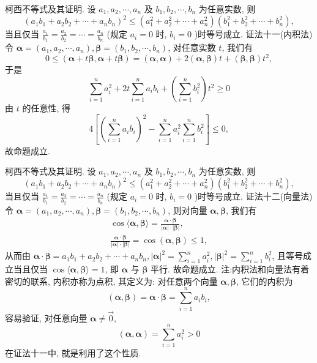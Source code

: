 柯西不等式及其证明.
设 $a_1, a_2, \cdots, a_n$ 及 $b_1, b_2, \cdots, b_n$ 为任意实数, 则
$$
\left(a_1 b_1+a_2 b_2+\cdots+a_n b_n\right)^2 \leqslant\left(a_1^2+a_2^2+\cdots+a_n^2\right)\left(b_1^2+b_2^2+\cdots+b_n^2\right),
$$
当且仅当 $\frac{a_1}{b_1}=\frac{a_2}{b_2}=\cdots=\frac{a_n}{b_n}$ (规定 $a_i=0$ 时, $b_i=0$ )时等号成立.
证法十一(内积法)
令 $\boldsymbol{\alpha}=\left(a_1, a_2, \cdots, a_n\right), \boldsymbol{\beta}=\left(b_1, b_2, \cdots, b_n\right)$, 对任意实数 $t$, 我们有
$$
0 \leqslant(\boldsymbol{\alpha}+t \boldsymbol{\beta}, \boldsymbol{\alpha}+t \boldsymbol{\beta})=(\boldsymbol{\alpha}, \boldsymbol{\alpha})+2(\boldsymbol{\alpha}, \boldsymbol{\beta}) t+(\boldsymbol{\beta}, \boldsymbol{\beta}) t^2,
$$
于是
$$
\sum_{i=1}^n a_i^2+2 t \sum_{i=1}^n a_i b_i+\left(\sum_{i=1}^n b_i^2\right) t^2 \geqslant 0
$$
由 $t$ 的任意性, 得
$$
4\left[\left(\sum_{i=1}^n a_i b_i\right)^2-\sum_{i=1}^n a_i^2 \sum_{i=1}^n b_i^2\right] \leqslant 0,
$$
故命题成立.



柯西不等式及其证明.
设 $a_1, a_2, \cdots, a_n$ 及 $b_1, b_2, \cdots, b_n$ 为任意实数, 则
$$
\left(a_1 b_1+a_2 b_2+\cdots+a_n b_n\right)^2 \leqslant\left(a_1^2+a_2^2+\cdots+a_n^2\right)\left(b_1^2+b_2^2+\cdots+b_n^2\right),
$$
当且仅当 $\frac{a_1}{b_1}=\frac{a_2}{b_2}=\cdots=\frac{a_n}{b_n}$ (规定 $a_i=0$ 时, $b_i=0$ )时等号成立.
证法十二(向量法)
令 $\boldsymbol{\alpha}=\left(a_1, a_2, \cdots, a_n\right), \boldsymbol{\beta}=\left(b_1, b_2, \cdots, b_n\right)$, 则对向量 $\boldsymbol{\alpha}, \boldsymbol{\beta}$, 我们有
$$
\begin{gathered}
\cos \langle\boldsymbol{\alpha}, \boldsymbol{\beta}\rangle=\frac{\boldsymbol{\alpha} \cdot \boldsymbol{\beta}}{|\boldsymbol{\alpha}| \cdot|\boldsymbol{\beta}|}, \\
\frac{\boldsymbol{\alpha} \cdot \boldsymbol{\beta}}{|\boldsymbol{\alpha}| \cdot|\boldsymbol{\beta}|}=\cos (\boldsymbol{\alpha}, \boldsymbol{\beta}) \leqslant 1,
\end{gathered}
$$
从而由 $\boldsymbol{\alpha} \cdot \boldsymbol{\beta}=a_1 b_1+a_2 b_2+\cdots+a_n b_n,|\boldsymbol{\alpha}|^2=\sum_{i=1}^n a_i^2,|\boldsymbol{\beta}|^2=\sum_{i=1}^n b_i^2$, 且等号成立当且仅当 $\cos \langle\boldsymbol{\alpha}, \boldsymbol{\beta}\rangle=1$, 即 $\boldsymbol{\alpha}$ 与 $\boldsymbol{\beta}$ 平行.
故命题成立.
注:内积法和向量法有着密切的联系, 内积亦称为点积, 其定义为: 对任意两个向量 $\boldsymbol{\alpha}, \boldsymbol{\beta}$, 它们的内积为
$$
(\boldsymbol{\alpha}, \boldsymbol{\beta})=\boldsymbol{\alpha} \cdot \boldsymbol{\beta}=\sum_{i=1}^n a_i b_i,
$$
容易验证, 对任意向量 $\boldsymbol{\alpha} \neq \overrightarrow{0}$,
$$
(\boldsymbol{\alpha}, \boldsymbol{\alpha})=\sum_{i=1}^n a_i^2>0
$$
在证法十一中, 就是利用了这个性质.



